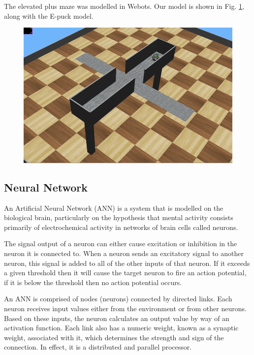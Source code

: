The elevated plus maze was modelled in Webots. Our model is shown in Fig. \ref{fig:arena}, along with the E-puck model.

\begin{figure}[H]
	\centering
	\begin{minipage}{.5\textwidth}
		\centering
		\includegraphics[width=.85\linewidth]{arena}
		\label{fig:arena}
	\end{minipage}%
\end{figure}

\subsection{Neural Network}

An Artificial Neural Network (ANN) is a system that is modelled on the biological brain, particularly on the hypothesis that mental activity consists primarily of electrochemical activity in networks of brain cells called neurons.

The signal output of a neuron can either cause excitation or inhibition in the neuron it is connected to. When a neuron sends an excitatory signal to another neuron, this signal is added to all of the other inputs of that neuron. If it exceeds a given threshold then it will cause the target neuron to fire an action potential, if it is below the threshold then no action potential occurs. \cite{Russell2009}

An ANN is comprised of nodes (neurons) connected by directed links. Each neuron receives input values either from the environment or from other neurons. Based on these inputs, the neuron calculates an output value by way of an activation function. Each link also has a numeric weight, known as a synaptic weight, associated with it, which determines the strength and sign of the connection. In effect, it is a distributed and parallel processor.

